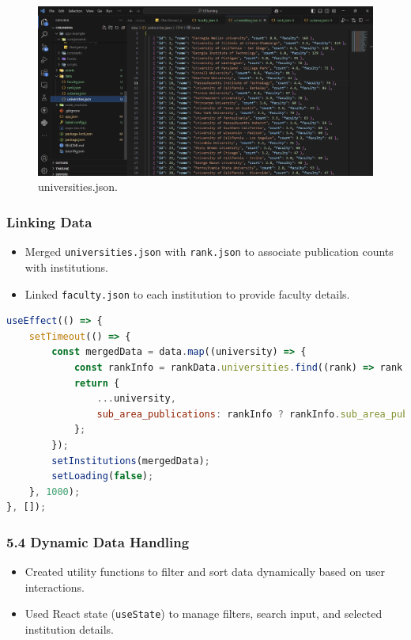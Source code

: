 \documentclass[12pt]{article}
\begin{document}
\begin{figure}[H]
    \centering
    \includegraphics[width=\textwidth]{json4.png} %
    \caption{universities.json.}
    \label{fig:example_image}
\end{figure}

\subsubsection*{Linking Data}
\begin{itemize}
    \item Merged \texttt{universities.json} with \texttt{rank.json} to associate publication counts with institutions.
    \item Linked \texttt{faculty.json} to each institution to provide faculty details.
\end{itemize}

\begin{lstlisting}[language=JavaScript, caption={Dynamic Data Integration with \texttt{useEffect}}, label={lst:useEffectDataIntegration}]
useEffect(() => {
    setTimeout(() => {
        const mergedData = data.map((university) => {
            const rankInfo = rankData.universities.find((rank) => rank.name === university.name);
            return {
                ...university,
                sub_area_publications: rankInfo ? rankInfo.sub_area_publications : [],
            };
        });
        setInstitutions(mergedData);
        setLoading(false);
    }, 1000);
}, []);
\end{lstlisting}


\subsubsection*{5.4 Dynamic Data Handling}
\begin{itemize}
    \item Created utility functions to filter and sort data dynamically based on user interactions.
    \item Used React state (\texttt{useState}) to manage filters, search input, and selected institution details.
\end{itemize}
\end{document}
